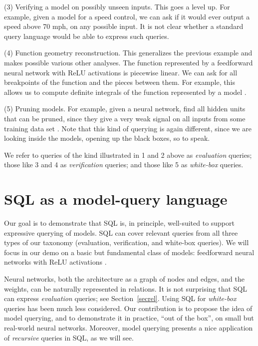 \documentclass{article}
\begin{document}
(3)    Verifying a model on possibly unseen inputs.
    This goes a level up.  For example, given a model for a speed
    control, we can ask if it would ever output a speed above 70
    mph, on any possible input.  It is not clear whether a
    standard query language would be able to express such
    queries.


(4)    Function geometry reconstruction. This
    generalizes the previous example and makes possible various
    other analyses.  The function represented by a feedforward
    neural network with ReLU activations is piecewise linear.  We
    can ask for all breakpoints of the function and the pieces
    between them.  For example, this allows us to compute
    definite integrals of the function represented by a model
    \cite{ql4nn}.


(5)    Pruning models. For example, given a neural network, find all
    hidden units that can be pruned, since they give a very weak
    signal on all inputs from some training data set
    \cite{pruning-nn}.  Note that this kind of querying is again
    different, since we are looking inside the models,
    opening up the black boxes, so to speak.


We refer to queries of the kind illustrated in 1 and 2 above as
\emph{evaluation} queries; those like 3 and 4 as
\emph{verification} queries; and those like 5 as \emph{white-box}
queries.

\section{SQL as a model-query language}

Our goal is to demonstrate that SQL is, in principle, well-suited
to support expressive querying of models.  SQL can cover relevant
queries from all three types of our taxonomy (evaluation,
verification, and white-box queries).  We will focus in our demo
on a basic but fundamental class of models: feedforward neural
networks with ReLU activations \cite{goodfellow-book}.

Neural networks, both the architecture as a graph of nodes and
edges, and the weights, can be naturally represented in
relations.  It is not surprising that SQL can express
\emph{evaluation} queries; see Section~\ref{secrel}.
Using SQL for \emph{white-box} queries has been much less considered.
Our contribution is to propose the idea of
model querying, and to demonstrate it in practice, ``out of
the box'', on small but real-world neural networks.
Moreover, model querying presents a nice
application of \emph{recursive} queries in SQL, as we will see.
\end{document}
